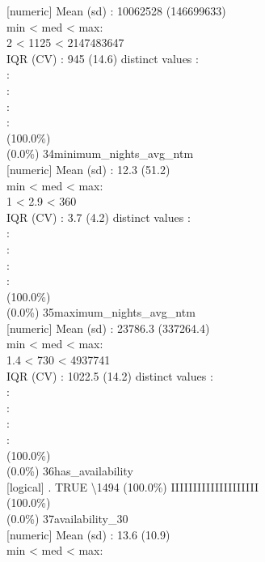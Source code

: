 \documentclass[
  journal,
]{IEEEtran}%
\begin{document}
{[}numeric{]} \textbar Mean (sd) : 10062528 (146699633)\\
min \textless{} med \textless{} max:\\
2 \textless{} 1125 \textless{} 2147483647\\
IQR (CV) : 945 (14.6)  distinct values \textbar{} \textbar:\\
:\\
:\\
:\\
: \\
(100.0\%) \\
(0.0\%) \textbar{} \textbar{} 34\textbar minimum\_nights\_avg\_ntm\\
{[}numeric{]} \textbar Mean (sd) : 12.3 (51.2)\\
min \textless{} med \textless{} max:\\
1 \textless{} 2.9 \textless{} 360\\
IQR (CV) : 3.7 (4.2)  distinct values \textbar{} \textbar:\\
:\\
:\\
:\\
: \\
(100.0\%) \\
(0.0\%) \textbar{} \textbar{} 35\textbar maximum\_nights\_avg\_ntm\\
{[}numeric{]} \textbar Mean (sd) : 23786.3 (337264.4)\\
min \textless{} med \textless{} max:\\
1.4 \textless{} 730 \textless{} 4937741\\
IQR (CV) : 1022.5 (14.2)  distinct values \textbar{}
\textbar:\\
:\\
:\\
:\\
: \\
(100.0\%) \\
(0.0\%) \textbar{} \textbar{} 36\textbar has\_availability\\
{[}logical{]} . TRUE \textbar\textbackslash1494 (100.0\%)
\textbar{} \textbar IIIIIIIIIIIIIIIIIIII \\
(100.0\%) \\
(0.0\%) \textbar{} \textbar{} 37\textbar availability\_30\\
{[}numeric{]} \textbar Mean (sd) : 13.6 (10.9)\\
min \textless{} med \textless{} max:\\
\end{document}
